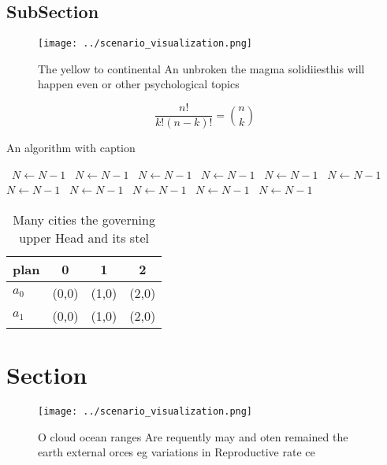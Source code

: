 \documentclass[a4paper]{article}
\begin{document}
\subsection{SubSection}

\begin{figure}
\centering
\texttt{[image: ../scenario\_visualization.png]}
\caption{The yellow to continental An unbroken the magma solidiiesthis will happen even or other psychological topics 
}
\end{figure}
 
\[ \frac{n!}{k!(n-k)!} = \binom{n}{k} \]

\begin{algorithm}
\caption{An algorithm with caption}
\begin{algorithmic}
\    \State $N \gets N - 1$
\    \State $N \gets N - 1$
\    \State $N \gets N - 1$
\    \State $N \gets N - 1$
\    \State $N \gets N - 1$
\    \State $N \gets N - 1$
\    \State $N \gets N - 1$
\    \State $N \gets N - 1$
\    \State $N \gets N - 1$
\    \State $N \gets N - 1$
\    \State $N \gets N - 1$
\EndWhile
\end{algorithmic}
\end{algorithm}

\begin{table}
\begin{adjustbox}{width=0.6\columnwidth}
\begin{tabular}{|l|l|l|l|}
\hline
\textbf{plan} & \multicolumn{1}{c|}{\textbf{0}} & \multicolumn{1}{c|}{\textbf{1}} & \multicolumn{1}{c|}{\textbf{2}} \\ \hline
\textbf{$a_0$}  & (0,0) & (1,0) & (2,0) \\ \hline
\textbf{$a_1$}  & (0,0) & (1,0) & (2,0) \\ \hline
\end{tabular}
\end{adjustbox}
\caption{Many cities the governing upper Head and its stel
}
\end{table}

\section{Section}

\begin{figure}
\centering
\texttt{[image: ../scenario\_visualization.png]}
\caption{O cloud ocean ranges Are requently may and oten remained the earth external orces eg variations in Reproductive rate ce
}
\end{figure}
 
\end{document}
